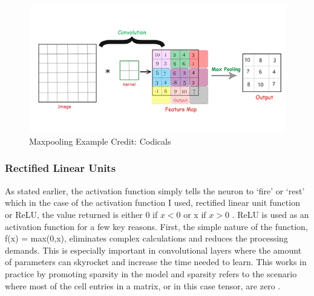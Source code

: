 \documentclass[12pt]{article}
\begin{document}
                \begin{figure}[ht]
            
                    \begin{center}
    
                        \includegraphics[scale=0.9]{maxpooling.png}
                        \caption{Maxpooling Example \cite{kumar2021} Credit: Codicals}
                        \label{maxpool-fig}
            
                    \end{center}
                    
                \end{figure}

            \subsubsection{Rectified Linear Units}

                As stated earlier, the activation function simply tells the neuron to ‘fire’ or ‘rest’ 
                which in the case of the activation function I used, rectified linear unit function or ReLU, 
                the value returned is either 0 if $ x < 0 $ or x if $ x > 0 $ \cite{agarap2019}. 
                ReLU is used as an activation function for a few key reasons. First, the simple nature of the function, 
                f(x) = max(0,x), eliminates complex calculations and reduces the processing demands. 
                This is especially important in convolutional layers where the amount of parameters can skyrocket 
                and increase the time needed to learn. This works in practice by promoting sparsity in the model 
                and sparsity refers to the scenario where most of the cell entries in a matrix, 
                or in this case tensor, are zero \cite{giskard}.
                
\end{document}
